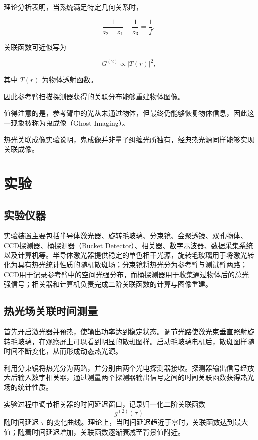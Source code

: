 \documentclass[a4paper]{ctexart}
\begin{document}
理论分析表明，当系统满足特定几何关系时，

\begin{equation}
\frac1{z_2-z_1}
+
\frac1{z_3}
=
\frac1f,
\end{equation}

关联函数可近似写为

\begin{equation}
G^{(2)}
\propto
|T(r)|^2,
\end{equation}

其中
$T(r)$
为物体透射函数。

因此参考臂扫描探测器获得的关联分布能够重建物体图像。

值得注意的是，参考臂中的光从未通过物体，但最终仍能够恢复物体信息，因此这一现象被称为鬼成像（Ghost Imaging）。

热光关联成像实验说明，鬼成像并非量子纠缠光所独有，经典热光源同样能够实现关联成像。

\section{实验}

\subsection{实验仪器}

实验装置主要包括半导体激光器、旋转毛玻璃、分束镜、会聚透镜、双孔物体、CCD探测器、桶探测器（Bucket Detector）、相关器、数字示波器、数据采集系统以及计算机等。半导体激光器提供稳定的单色相干光源，旋转毛玻璃用于将激光转化为具有热光统计性质的随机散斑场；分束镜将热光分为参考臂与测试臂两路；CCD用于记录参考臂中的空间光强分布，而桶探测器用于收集通过物体后的总光强信号；相关器和计算机负责完成二阶关联函数的计算与图像重建。

\subsection{热光场关联时间测量}

首先开启激光器并预热，使输出功率达到稳定状态。调节光路使激光束垂直照射旋转毛玻璃，在观察屏上可以看到明显的散斑图样。启动毛玻璃电机后，散斑图样随时间不断变化，从而形成动态热光源。

利用分束镜将热光分为两路，并分别由两个光电探测器接收。探测器输出信号经放大后输入数字相关器，通过测量两个探测器输出信号之间的时间关联函数获得热光场的统计性质。

实验过程中调节相关器的时间延迟窗口，记录归一化二阶关联函数
\[
g^{(2)}(\tau)
\]
随时间延迟 $\tau$ 的变化曲线。理论上，当时间延迟趋近于零时，关联函数达到最大值；随着时间延迟增加，关联函数逐渐衰减至背景值附近。
\end{document}
